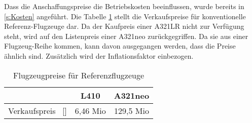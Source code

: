 Dass die Anschaffungspreise die Betriebskosten beeinflussen, 
wurde bereits in \ref{s:Kosten} angeführt. 
Die Tabelle \ref{Flugzeugpreise} stellt die Verkaufspreise 
für konventionelle Referenz-Flugzeuge dar.
Da der Kaufpreis einer A321LR nicht zur Verfügung steht, 
wird auf den Listenpreis einer A321neo zurückgegriffen. 
Da sie aus einer Flugzeug-Reihe kommen, kann davon ausgegangen werden, 
dass die Preise ähnlich sind. Zusätzlich wird der Inflationsfaktor einbezogen. %

\begin{table}[h]
	\begin{center}
    \caption{Flugzeugpreise für Referenzflugzeuge}
	\label{Flugzeugpreise}
	\begin{tabular}{|l|c|c|}
		\hline
		 & \textbf{L410} & \textbf{A321neo}  \\ \hline
		 Verkaufspreis ~[\text{EUR}] & 6,46 Mio \cite{marksel2023comparative} & 129,5 Mio \cite{aerotelegraph_airbus} \\ \hline
	\end{tabular}
    \end{center}
\end{table}


